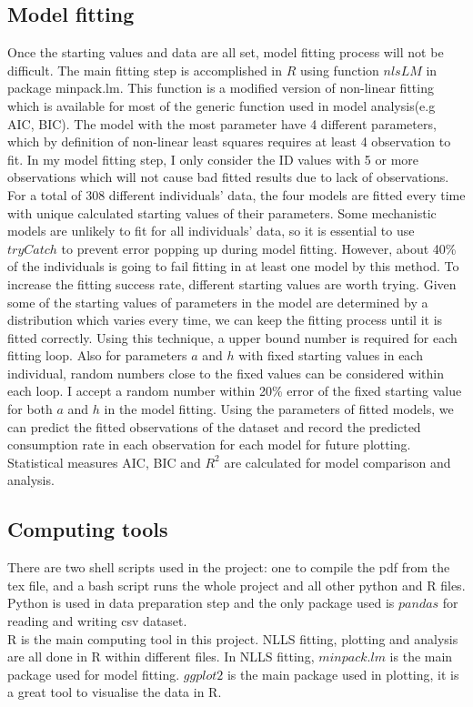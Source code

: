 \documentclass{article}[11pt,a4,twosided,doublespacing,titlepagenumber=on,numbers=endperiod]
\begin{document}
\subsection{Model fitting}
Once the starting values and data are all set, model fitting process will not be difficult. The main fitting step is accomplished in $R$ using function $nlsLM$ in package minpack.lm\cite{elzhov2016package}. This function is a modified version of non-linear fitting which is available for most of the generic function used in model analysis(e.g AIC, BIC). The model with the most parameter have 4 different parameters, which by definition of non-linear least squares requires at least 4 observation to fit. In my model fitting step, I only consider the ID values with 5 or more observations which will not cause bad fitted results due to lack of observations. \\
\noindent
For a total of 308 different individuals' data, the four models are fitted every time with unique calculated starting values of their parameters. Some mechanistic models are unlikely to fit for all individuals' data, so it is essential to use $tryCatch$ to prevent error popping up during model fitting. However, about 40\% of the individuals is going to fail fitting in at least one model by this method. To increase the fitting success rate, different starting values are worth trying. Given some of the starting values of parameters in the model are determined by a distribution which varies every time, we can keep the fitting process until it is fitted correctly. Using this technique, a upper bound number is required for each fitting loop. Also for parameters $a$ and $h$ with fixed starting values in each individual, random numbers close to the fixed values can be considered within each loop. I accept a random number within 20\% error of the fixed starting value for both $a$ and $h$ in the model fitting. Using the parameters of fitted models, we can predict the fitted observations of the dataset and record the predicted consumption rate in each observation for each model for future plotting. Statistical measures AIC, BIC and $R^2$ are calculated for model comparison and analysis.

\subsection{Computing tools}
There are two shell scripts used in the project: one to compile the pdf from the tex file, and a bash script runs the whole project and all other python and R files. \\
\noindent
Python is used in data preparation step and the only package used is $pandas$ for reading and writing csv dataset.\\
\noindent
R is the main computing tool in this project. NLLS fitting, plotting and analysis are all done in R within different files. In NLLS fitting, $minpack.lm$ is the main package used for model fitting. $ggplot2$ is the main package used in plotting, it is a great tool to visualise the data in R.
\end{document}
